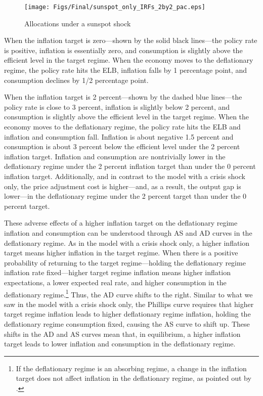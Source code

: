 \documentclass[11pt]{article}
\begin{document}
	\begin{figure}[!h]
		\begin{center}
			\caption{Allocations under a sunspot shock\label{fig:IRFs_Deflationary}}
			\texttt{[image: Figs/Final/sunspot\_only\_IRFs\_2by2\_pac.eps]}\\
		\end{center}
	\end{figure}

	When the inflation target is zero---shown by the solid black lines---the policy rate is positive, inflation is essentially zero, and consumption is slightly above the efficient level in the target regime. When the economy moves to the deflationary regime, the policy rate hits the ELB, inflation falls by 1 percentage point, and consumption declines by 1/2 percentage point.

	When the inflation target is 2 percent---shown by the dashed blue lines---the policy rate is close to 3 percent, inflation is slightly below 2 percent, and consumption is slightly above the efficient level in the target regime. When the economy moves to the deflationary regime, the policy rate hits the ELB and inflation and consumption fall. Inflation is about negative 1.5 percent and consumption is about 3 percent below the efficient level under the 2 percent inflation target. Inflation and consumption are nontrivially lower in the deflationary regime under the 2 percent inflation target than under the 0 percent inflation target. Additionally, and in contrast to the model with a crisis shock only, the price adjustment cost is higher---and, as a result, the output gap is lower---in the deflationary regime under the 2 percent target than under the 0 percent target.

	These adverse effects of a higher inflation target on the deflationary regime inflation and consumption can be understood through AS and AD curves in the deflationary regime. As in the model with a crisis shock only, a higher inflation target means higher inflation in the target regime. When there is a positive probability of returning to the target regime---holding the deflationary regime inflation rate fixed---higher target regime inflation means higher inflation expectations, a lower expected real rate, and higher consumption in the deflationary regime.\footnote{If the deflationary regime is an absorbing regime, a change in the inflation target does not affect inflation in the deflationary regime, as pointed out by \citet{CubaBordaSingh2018}.} Thus, the AD curve shifts to the right. Similar to what we saw in the model with a crisis shock only, the Phillips curve requires that higher target regime inflation leads to higher deflationary regime inflation, holding the deflationary regime consumption fixed, causing the AS curve to shift up. These shifts in the AD and AS curves mean that, in equilibrium, a higher inflation target leads to lower inflation and consumption in the deflationary regime.
\end{document}

